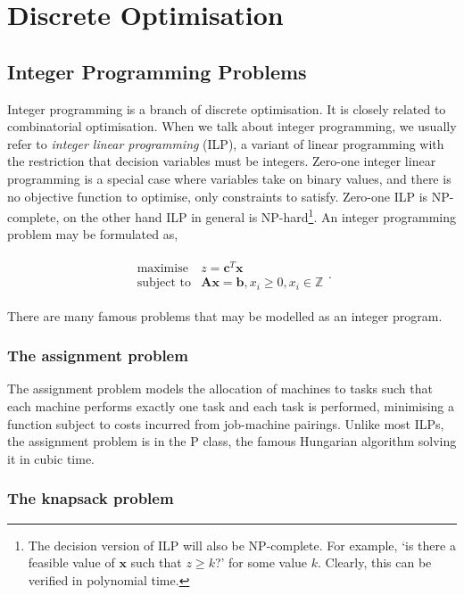 \documentclass[11pt]{amsart}
\begin{document}
\section{Discrete Optimisation}

\subsection{Integer Programming Problems}

Integer programming is a branch of discrete optimisation. It is closely related to combinatorial optimisation. When we talk about integer programming, we usually refer to \emph{integer linear programming} (ILP), a variant of linear programming with the restriction that decision variables must be integers. Zero-one integer linear programming is a special case where variables take on binary values, and there is no objective function to optimise, only constraints to satisfy. Zero-one ILP is NP-complete, on the other hand ILP in general is NP-hard\footnote{The decision version of ILP will also be NP-complete. For example, `is there a feasible value of $\mathbf{x}$ such that $z \geq k$?' for some value $k$. Clearly, this can be verified in polynomial time.}. An integer programming problem may be formulated as,

\begin{align}
\begin{array}{rl}
\text{maximise} & z = \mathbf{c}^T\mathbf{x} \\
\text{subject to} & \mathbf{A}\mathbf{x} = \mathbf{b}, x_i \geq 0, x_i \in \mathbb{Z}
\end{array}.
\label{eq:intprog}
\end{align}

There are many famous problems that may be modelled as an integer program.

\subsubsection{The assignment problem}

The assignment problem models the allocation of machines to tasks such that each machine performs exactly one task and each task is performed, minimising a function subject to costs incurred from job-machine pairings. Unlike most ILPs, the assignment problem is in the P class, the famous Hungarian algorithm solving it in cubic time.

\subsubsection{The knapsack problem}
\end{document}
